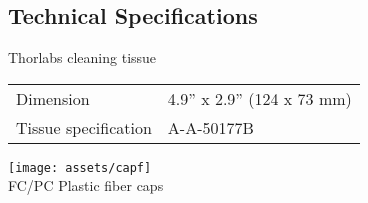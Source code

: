 \documentclass{article}
\begin{document}
\begin{multicols}{2}

\section{Technical Specifications}

Thorlabs cleaning tissue

\begin{tabular}{|l|l|}
  Dimension & 4.9'' x 2.9'' (124 x 73 mm) \\
  Tissue specification & A-A-50177B \\
\end{tabular}%


\end{multicols}
\begin{center}
\texttt{[image: assets/capf]} \\
FC/PC Plastic fiber caps
\end{center}
\end{document}
